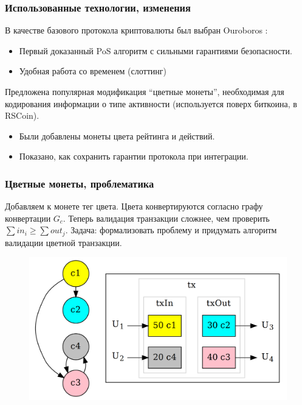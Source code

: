 \documentclass[11pt,handout,pdf,hyperref={unicode}]{beamer}
\begin{document}
\begin{frame}
  \frametitle{Использованные технологии, изменения}

  В качестве базового протокола криптовалюты был выбран Ouroboros
  \parencite{ouroboros}:
  \begin{itemize}
  \item Первый доказанный PoS алгоритм с сильными гарантиями безопасности.
  \item Удобная работа со временем (слоттинг)
  \end{itemize}

  Предложена популярная модификация ``цветные монеты'', необходимая
  для кодирования информации о типе активности (используется поверх
  биткоина, в RSCoin).
  \begin{itemize}
  \item Были добавлены монеты цвета рейтинга и действий.
  \item Показано, как сохранить гарантии протокола при интеграции.
  \end{itemize}
\end{frame}

\begin{frame}
  \frametitle{Цветные монеты, проблематика}

  Добавляем к монете тег цвета. Цвета конвертируются согласно графу
  конвертации $G_c$. Теперь валидация транзакции сложнее, чем
  проверить $\sum{in_i} \geq \sum {out_j}$. Задача: формализовать
  проблему и придумать алгоритм валидации цветной транзакции.

  \begin{figure}[t]
  \includegraphics[scale=0.15]{pres_colortx.png}
  \centering
  \end{figure}

\end{frame}
\end{document}
